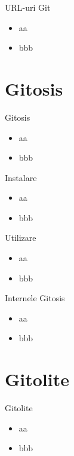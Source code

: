 \documentclass{simple}
\begin{document}
\begin{frame}{URL-uri Git}
	\begin{itemize}
		\item aa
		\item bbb
	\end{itemize}
\end{frame}

\section{Gitosis}

\frame{\tableofcontents[currentsection]}

\begin{frame}{Gitosis}
	\begin{itemize}
		\item aa
		\item bbb
	\end{itemize}
\end{frame}

\begin{frame}{Instalare}
	\begin{itemize}
		\item aa
		\item bbb
	\end{itemize}
\end{frame}

\begin{frame}{Utilizare}
	\begin{itemize}
		\item aa
		\item bbb
	\end{itemize}
\end{frame}

\begin{frame}{Internele Gitosis}
	\begin{itemize}
		\item aa
		\item bbb
	\end{itemize}
\end{frame}

\section{Gitolite}

\frame{\tableofcontents[currentsection]}

\begin{frame}{Gitolite}
	\begin{itemize}
		\item aa
		\item bbb
	\end{itemize}
\end{frame}
\end{document}
